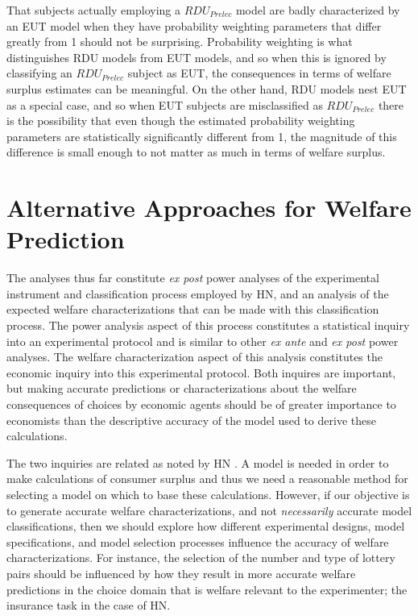 \documentclass[../main.tex]{subfiles}
\begin{document}
That subjects actually employing a $\mathit{RDU_{Prelec}}$ model are badly characterized by an EUT model when they have probability weighting parameters that differ greatly from 1 should not be surprising.
Probability weighting is what distinguishes RDU models from EUT models, and so when this is ignored by classifying an $\mathit{RDU_{Prelec}}$ subject as EUT, the consequences in terms of welfare surplus estimates can be meaningful.
On the other hand, RDU models nest EUT as a special case, and so when EUT subjects are misclassified as $\mathit{RDU_{Prelec}}$ there is the possibility that even though the estimated probability weighting parameters are statistically significantly different from 1, the magnitude of this difference is small enough to not matter as much in terms of welfare surplus.

\singlespacing
\section{Alternative Approaches for Welfare Prediction}
\doublespacing

The analyses thus far constitute \textit{ex post} power analyses of the experimental instrument and classification process employed by HN, and an analysis of the expected welfare characterizations that can be made with this classification process.
The power analysis aspect of this process constitutes a statistical inquiry into an experimental protocol and is similar to other \textit{ex ante} and \textit{ex post} power analyses.
The welfare characterization aspect of this analysis constitutes the economic inquiry into this experimental protocol.
Both inquires are important, but making accurate predictions or characterizations about the welfare consequences of choices by economic agents should be of greater importance to economists than the descriptive accuracy of the model used to derive these calculations.{\footnotemark}

\addtocounter{footnote}{-1}

The two inquiries are related as noted by HN \parencite*[105]{Harrison2016}.
A model is needed in order to make calculations of consumer surplus and thus we need a reasonable method for selecting a model on which to base these calculations.
However, if our objective is to generate accurate welfare characterizations, and not \textit{necessarily} accurate model classifications, then we should explore how different experimental designs, model specifications, and model selection processes influence the accuracy of welfare characterizations.
For instance, the selection of the number and type of lottery pairs should be influenced by how they result in more accurate welfare predictions in the choice domain that is welfare relevant to the experimenter; the insurance task in the case of HN.
\end{document}
